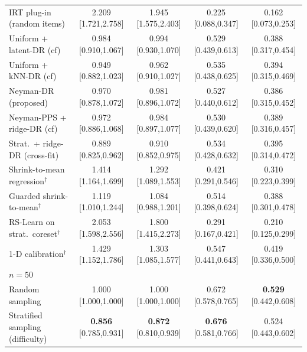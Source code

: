 \begin{tabular}{l cccc}
IRT plug-in (random items) & 2.209 {\scriptsize[1.721,2.758]} & 1.945 {\scriptsize[1.575,2.403]} & 0.225 {\scriptsize[0.088,0.347]} & 0.162 {\scriptsize[0.073,0.253]} \\
Uniform + latent-DR (cf) & 0.984 {\scriptsize[0.910,1.067]} & 0.994 {\scriptsize[0.930,1.070]} & 0.529 {\scriptsize[0.439,0.613]} & 0.388 {\scriptsize[0.317,0.454]} \\
Uniform + kNN-DR (cf) & 0.949 {\scriptsize[0.882,1.023]} & 0.962 {\scriptsize[0.910,1.027]} & 0.535 {\scriptsize[0.438,0.625]} & 0.394 {\scriptsize[0.315,0.469]} \\
Neyman-DR (proposed) & 0.970 {\scriptsize[0.878,1.072]} & 0.981 {\scriptsize[0.896,1.072]} & 0.527 {\scriptsize[0.440,0.612]} & 0.386 {\scriptsize[0.315,0.452]} \\
Neyman-PPS + ridge-DR (cf) & 0.972 {\scriptsize[0.886,1.068]} & 0.984 {\scriptsize[0.897,1.077]} & 0.530 {\scriptsize[0.439,0.620]} & 0.389 {\scriptsize[0.316,0.457]} \\
Strat.\ + ridge-DR (cross-fit) & 0.889 {\scriptsize[0.825,0.962]} & 0.910 {\scriptsize[0.852,0.975]} & 0.534 {\scriptsize[0.428,0.632]} & 0.395 {\scriptsize[0.314,0.472]} \\
Shrink-to-mean regression$^\dagger$ & 1.414 {\scriptsize[1.164,1.699]} & 1.292 {\scriptsize[1.089,1.553]} & 0.421 {\scriptsize[0.291,0.546]} & 0.310 {\scriptsize[0.223,0.399]} \\
Guarded shrink-to-mean$^\dagger$ & 1.119 {\scriptsize[1.010,1.244]} & 1.084 {\scriptsize[0.988,1.201]} & 0.514 {\scriptsize[0.398,0.624]} & 0.388 {\scriptsize[0.301,0.478]} \\
RS-Learn on strat.\ coreset$^\dagger$ & 2.053 {\scriptsize[1.598,2.556]} & 1.800 {\scriptsize[1.415,2.273]} & 0.291 {\scriptsize[0.167,0.421]} & 0.210 {\scriptsize[0.125,0.299]} \\
1-D calibration$^\dagger$ & 1.429 {\scriptsize[1.152,1.786]} & 1.303 {\scriptsize[1.085,1.577]} & 0.547 {\scriptsize[0.441,0.643]} & 0.419 {\scriptsize[0.336,0.500]} \\
\midrule
\multicolumn{5}{l}{\emph{$n=50$}}\\
Random sampling & 1.000 {\scriptsize[1.000,1.000]} & 1.000 {\scriptsize[1.000,1.000]} & 0.672 {\scriptsize[0.578,0.765]} & \textbf{0.529} {\scriptsize[0.442,0.608]} \\
Stratified sampling (difficulty) & \textbf{0.856} {\scriptsize[0.785,0.931]} & \textbf{0.872} {\scriptsize[0.810,0.939]} & \textbf{0.676} {\scriptsize[0.581,0.766]} & 0.524 {\scriptsize[0.443,0.602]} \\

\end{tabular}
